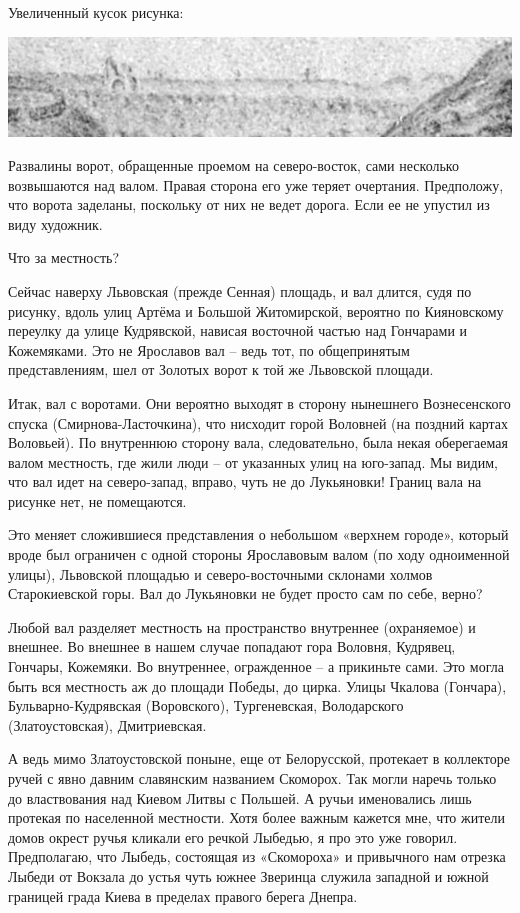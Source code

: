 Увеличенный кусок рисунка:

\begin{center}
\includegraphics[width=\linewidth]{chast-colebanie-osnov/gora-zamkovaya-valovaya/val-big.jpg}
\end{center}

Развалины ворот, обращенные проемом на северо-восток, сами несколько возвышаются над валом. Правая сторона его уже теряет очертания. Предположу, что ворота заделаны, поскольку от них не ведет дорога. Если ее не упустил из виду художник.

Что за местность?

Сейчас наверху Львовская (прежде Сенная) площадь, и вал длится, судя по рисунку, вдоль улиц Артёма и Большой Житомирской, вероятно по Кияновскому переулку да улице Кудрявской, нависая восточной частью над Гончарами и Кожемяками. Это не Ярославов вал – ведь тот, по общепринятым представлениям, шел от Золотых ворот к той же Львовской площади.

Итак, вал с воротами. Они вероятно выходят в сторону нынешнего Вознесенского спуска (Смирнова-Ласточ\-кина), что нисходит горой Воловней (на поздний картах Воловьей). По внутреннюю сторону вала, следовательно, была некая оберегаемая валом местность, где жили люди – от указанных улиц на юго-запад. Мы видим, что вал идет на северо-запад, вправо, чуть не до Лукьяновки! Границ вала на рисунке нет, не помещаются.

Это меняет сложившиеся представления о небольшом «верхнем городе», который вроде был ограничен с одной стороны Ярославовым валом (по ходу одноименной улицы), Львовской площадью и северо-восточными склонами холмов Старокиевской горы. Вал до Лукьяновки не будет просто сам по себе, верно?

Любой вал разделяет местность на пространство внутреннее (охраняемое) и внешнее. Во внешнее в нашем случае попадают гора Воловня, Кудрявец, Гончары, Кожемяки. Во внутреннее, огражденное – а прикиньте сами. Это могла быть вся местность аж до площади Победы, до цирка. Улицы Чкалова (Гончара), Бульварно-Кудрявская (Воровского), Тургеневская, Володарского (Златоустовская), Дмитриевская.

А ведь мимо Златоустовской поныне, еще от Белорусской, протекает в коллекторе ручей с явно давним славянским названием Скоморох. Так могли наречь только до властвования над Киевом Литвы с Польшей. А ручьи именовались лишь протекая по населенной местности. Хотя более важным кажется мне, что жители домов окрест ручья кликали его речкой Лыбедью, я про это уже говорил. Предполагаю, что Лыбедь, состоящая из «Скомороха» и привычного нам отрезка Лыбеди от Вокзала до устья чуть южнее Зверинца служила западной и южной границей града Киева в пределах правого берега Днепра. 

